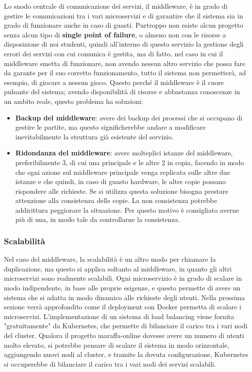 Lo snodo centrale di comunicazione dei servizi, il middleware, è in grado di gestire le comunicazioni tra i vari microservizi e di garantire che il sistema sia in grado di funzionare anche in caso di guasti.
Purtroppo non esiste alcun progetto senza alcun tipo di \textbf{single point of failure}, o almeno non con le risorse a disposizione di noi studenti, quindi all'interno di questo servizio la 
gestione degli errori dei servizi con cui comunica è gestita, ma di fatto, nel caso in cui il middleware smetta di funzionare, non avendo nessun altro servizio che possa fare da garante 
per il suo corretto funzionamento, tutto il sistema non permetterà, ad esempio, di giocare a nessun gioco.
Questo perché il middleware è il cuore pulsante del sistema; avendo disponibilità di risorse e abbastanza conoscenze in un ambito reale, questo problema ha soluzioni: 
\begin{itemize}
    \item \textbf{Backup del middleware}: avere dei backup dei processi che si occupano di gestire le partite, ma questo significherebbe andare a modificare inevitabilmente 
    la struttura già esistente del servizio.
    \item \textbf{Ridondanza del middleware}: avere molteplici istanze del middleware, preferibilmente 3, di cui una principale e le altre 2 in copia, facendo in modo che
    ogni azione sul middleware principale venga replicata sulle altre due istanze e che quindi, in caso di guasto hardware, le altre copie possano rispondere alle richieste.
    Se si utilizza questa soluzione bisogna prestare attenzione alla consistenza delle copie. La non consistenza potrebbe addirittura peggiorare la situazione.
    Per questo motivo è consigliato averne più di una, in modo tale da controllarne la consistenza.
\end{itemize}

\subsubsection{Scalabilità}

Nel caso del middleware, la scalabilità è un altro modo per chiamare la duplicazione, ma questo si applica soltanto al middleware, in quanto gli altri microservizi sono realmente scalabili.
Ogni microservizio è in grado di scalare in modo indipendente, in base alle proprie esigenze, e questo permette di avere un sistema che si adatta in modo dinamico alle richieste degli utenti. 
Nella prossima sezione verrà approfondito come il deployment con Docker permetta di scalare i microservizi. L'implementazione di un sistema di load balancing viene fornita
"gratuitamente" da Kubernetes, che permette di bilanciare il carico tra i vari nodi del cluster. 
Qualora il progetto maraffa-online dovesse avere un numero di utenti molto elevato, si potrebbe pensare di scalare il sistema in modo orizzontale, aggiungendo nuovi nodi al cluster, 
e tramite la dovuta configurazione, Kubernetes si occuperebbe di bilanciare il carico tra i vari nodi dei servizi scalabili. 


